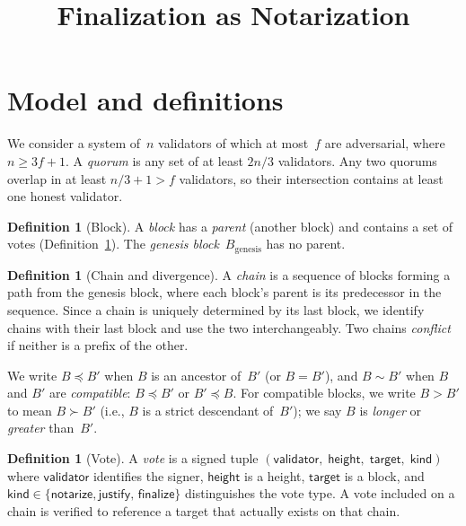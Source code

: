 \documentclass{article}
\title{Finalization as Notarization}
\newcommand{\target}{\mathsf{target}}
\newcommand{\kind}{\mathsf{kind}}
\newcommand{\height}{\mathsf{height}}
\newcommand{\finalize}{\mathsf{finalize}}
\newcommand{\validator}{\mathsf{validator}}
\newcommand{\justify}{\mathsf{justify}}
\newcommand{\notarize}{\mathsf{notarize}}
\theoremstyle{plain}
\theoremstyle{definition}
\newtheorem{definition}[theorem]{Definition}
\theoremstyle{remark}
\begin{document}
\maketitle

\section{Model and definitions}

We consider a system of~$n$ validators of which at most~$f$ are adversarial, where $n \geq 3f + 1$.
A \emph{quorum} is any set of at least $2n/3$ validators.
Any two quorums overlap in at least $n/3 + 1 > f$ validators, so their intersection contains at least one honest validator.

\begin{definition}[Block]\label{def:block}
A \emph{block} has a \emph{parent} (another block) and contains a set of votes (Definition~\ref{def:vote}).
The \emph{genesis block}~$B_{\mathrm{genesis}}$ has no parent.
\end{definition}

\begin{definition}[Chain and divergence]\label{def:chain}
A \emph{chain} is a sequence of blocks forming a path from the genesis block, where each block's parent is its predecessor in the sequence.
Since a chain is uniquely determined by its last block, we identify chains with their last block and use the two interchangeably.
Two chains \emph{conflict} if neither is a prefix of the other.
\end{definition}

We write $B \preceq B'$ when $B$ is an ancestor of~$B'$ (or $B = B'$), and $B \sim B'$ when $B$ and $B'$ are \emph{compatible}: $B \preceq B'$ or $B' \preceq B$.
For compatible blocks, we write $B > B'$ to mean $B \succ B'$ (i.e., $B$ is a strict descendant of~$B'$); we say $B$ is \emph{longer} or \emph{greater} than~$B'$.

\begin{definition}[Vote]\label{def:vote}
A \emph{vote} is a signed tuple $(\validator,\; \height,\; \target,\; \kind)$ where $\validator$ identifies the signer, $\height$ is a height, $\target$ is a block, and $\kind \in \{\notarize, \justify,\, \finalize\}$ distinguishes the vote type.
A vote included on a chain is verified to reference a target that actually exists on that chain.
\end{definition}
\end{document}
